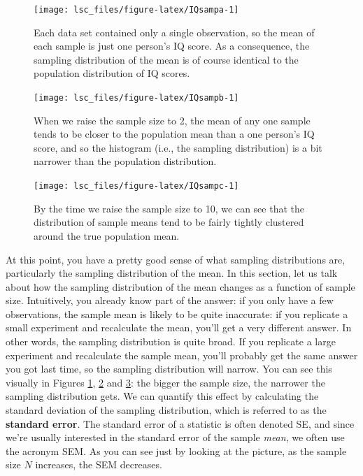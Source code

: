 \documentclass[
]{book}
\theoremstyle{definition}
\theoremstyle{definition}
\theoremstyle{definition}
\theoremstyle{definition}
\theoremstyle{remark}
\begin{document}
\begin{figure}

{\centering \texttt{[image: lsc\_files/figure-latex/IQsampa-1]} 

}

\caption{Each data set contained only a single observation, so the mean of each sample is just one person's IQ score. As a consequence, the sampling distribution of the mean is of course identical to the population distribution of IQ scores.}\label{fig:IQsampa}
\end{figure}

\begin{figure}

{\centering \texttt{[image: lsc\_files/figure-latex/IQsampb-1]} 

}

\caption{When we raise the sample size to 2, the mean of any one sample tends to be closer to the population mean than a one person's IQ score, and so the histogram (i.e., the sampling distribution) is a bit narrower than the population distribution.}\label{fig:IQsampb}
\end{figure}

\begin{figure}

{\centering \texttt{[image: lsc\_files/figure-latex/IQsampc-1]} 

}

\caption{By the time we raise the sample size to 10, we can see that the distribution of sample means tend to be fairly tightly clustered around the true population mean.}\label{fig:IQsampc}
\end{figure}

At this point, you have a pretty good sense of what sampling distributions are, particularly the sampling distribution of the mean. In this section, let us talk about how the sampling distribution of the mean changes as a function of sample size. Intuitively, you already know part of the answer: if you only have a few observations, the sample mean is likely to be quite inaccurate: if you replicate a small experiment and recalculate the mean, you'll get a very different answer. In other words, the sampling distribution is quite broad. If you replicate a large experiment and recalculate the sample mean, you'll probably get the same answer you got last time, so the sampling distribution will narrow. You can see this visually in Figures \ref{fig:IQsampa}, \ref{fig:IQsampb} and \ref{fig:IQsampc}: the bigger the sample size, the narrower the sampling distribution gets. We can quantify this effect by calculating the standard deviation of the sampling distribution, which is referred to as the \textbf{standard error}. The standard error of a statistic is often denoted SE, and since we're usually interested in the standard error of the sample \emph{mean}, we often use the acronym SEM. As you can see just by looking at the picture, as the sample size \(N\) increases, the SEM decreases.
\end{document}
